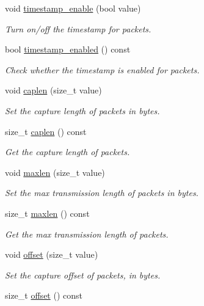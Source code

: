 \begin{DoxyCompactItemize}
void \hyperlink{classnet_1_1pfq_ac8dc23932b27dd04c8ecbdcbabe931b8}{timestamp\-\_\-enable} (bool value)
\begin{DoxyCompactList}\small\item\em Turn on/off the timestamp for packets. \end{DoxyCompactList}\item 
bool \hyperlink{classnet_1_1pfq_a7939df6cf5127dd8672e1ca0a68fa648}{timestamp\-\_\-enabled} () const 
\begin{DoxyCompactList}\small\item\em Check whether the timestamp is enabled for packets. \end{DoxyCompactList}\item 
void \hyperlink{classnet_1_1pfq_aa915603b2ad8d1226f9bbea0050945c0}{caplen} (size\-\_\-t value)
\begin{DoxyCompactList}\small\item\em Set the capture length of packets in bytes. \end{DoxyCompactList}\item 
size\-\_\-t \hyperlink{classnet_1_1pfq_aa0d64b89a345ca5426a694f6583106c3}{caplen} () const 
\begin{DoxyCompactList}\small\item\em Get the capture length of packets. \end{DoxyCompactList}\item 
void \hyperlink{classnet_1_1pfq_a0424e39990711493af4f24a0c3e9be4d}{maxlen} (size\-\_\-t value)
\begin{DoxyCompactList}\small\item\em Set the max transmission length of packets in bytes. \end{DoxyCompactList}\item 
size\-\_\-t \hyperlink{classnet_1_1pfq_a869695c441902d0342212d7581f3e362}{maxlen} () const 
\begin{DoxyCompactList}\small\item\em Get the max transmission length of packets. \end{DoxyCompactList}\item 
void \hyperlink{classnet_1_1pfq_a83ed78c8c7bc2de33e75e244bbc0b603}{offset} (size\-\_\-t value)
\begin{DoxyCompactList}\small\item\em Set the capture offset of packets, in bytes. \end{DoxyCompactList}\item 
size\-\_\-t \hyperlink{classnet_1_1pfq_ad419e5ef48bb5f9639c798b3d2dd1660}{offset} () const 

\end{DoxyCompactItemize}

